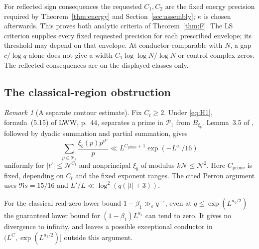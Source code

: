\documentclass[11pt]{article}
\theoremstyle{definition}
\newcommand{\GN}{\mathcal N}
\theoremstyle{remark}
\newtheorem{remark}[theorem]{Remark}
\numberwithin{equation}{section}
\begin{document}
For reflected sign consequences the requested $C_1,C_2$ are the
fixed energy precision required by Theorem~\ref{thm:energy} and
Section~\ref{sec:assembly}; $\kappa$ is chosen afterwards.
This proves both analytic criteria of Theorem~\ref{thm:F}.
The LS criterion supplies every fixed requested precision for
each prescribed envelope; its threshold may depend on that
envelope. At conductor comparable with $N$, a gap $c/\log q$
alone does not give a width $C_1\log\log N/\log N$ or control
complex zeros. The reflected consequences are on the displayed
classes only.

\subsection{The classical-region obstruction}\label{subsec:obstruction}
\begin{remark}[A separate contour estimate]\label{rem:other-contour}
Fix $C_t\ge2$. Under \eqref{eq:H1}, formula~(5.15) of LWW,
p.~44, separates a prime in $\mathcal P_1$ from $B_{\xi_b}$.
Lemma~3.5 of \cite{GuoRGP}, followed by dyadic summation and
partial summation, gives
\begin{equation}\label{eq:other-prime-estimate}
 \sum_{p\in\mathcal P_1}\frac{\xi_b(p)p^{it'}}p
 \ll L^{C_{\mathrm{prime}}+1}\exp(-L^{a_1}/16)
\end{equation}
uniformly for $|t'|\le\GN^{C_t}$ and nonprincipal $\xi_b$ of
modulus $k\GN\le\GN^2$. Here $C_{\mathrm{prime}}$ is fixed,
depending on $C_t$ and the fixed exponent ranges.
The cited Perron argument uses $\Re s=15/16$ and
$L'/L\ll\log^2(q(|t|+3))$.

For the classical real-zero lower bound
$1-\beta_1\gg_\varepsilon q^{-\varepsilon}$, even at
$q\le\exp(L^{a_1/2})$ the guaranteed lower bound for
$(1-\beta_1)L^{a_1}$ can tend to zero. It gives no divergence to
infinity, and leaves a possible exceptional conductor in
$(L^{C},\exp(L^{a_1/2})]$ outside this argument.
\end{remark}
\end{document}
